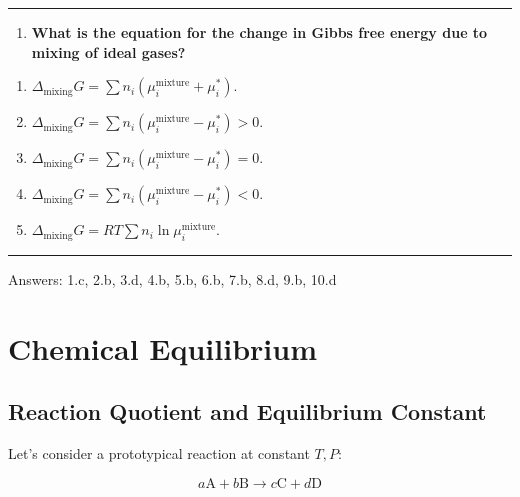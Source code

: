 \documentclass[
  9pt,
]{extbook}
\providecommand{\tightlist}{%
  \setlength{\itemsep}{0pt}\setlength{\parskip}{0pt}}
\theoremstyle{definition}
\theoremstyle{definition}
\theoremstyle{definition}
\theoremstyle{definition}
\theoremstyle{remark}
\begin{document}
\begin{center}\rule{0.5\linewidth}{0.5pt}\end{center}

\begin{enumerate}
\def\labelenumi{\arabic{enumi}.}
\setcounter{enumi}{9}
\tightlist
\item
  \textbf{What is the equation for the change in Gibbs free energy due to mixing of ideal gases?}
\end{enumerate}

\begin{enumerate}
\def\labelenumi{\alph{enumi}.}
\tightlist
\item
  \(\Delta_{\text{mixing}}G = \sum n_i(\mu_i^{\text{mixture}} + \mu_i^*)\).
\item
  \(\Delta_{\text{mixing}}G = \sum n_i(\mu_i^{\text{mixture}} - \mu_i^*) > 0\).
\item
  \(\Delta_{\text{mixing}}G = \sum n_i(\mu_i^{\text{mixture}} - \mu_i^*) = 0\).
\item
  \(\Delta_{\text{mixing}}G = \sum n_i(\mu_i^{\text{mixture}} - \mu_i^*) < 0\).
\item
  \(\Delta_{\text{mixing}}G = RT\sum n_i\ln\mu_i^{\text{mixture}}\).
\end{enumerate}

\begin{center}\rule{0.5\linewidth}{0.5pt}\end{center}

Answers: 1.c, 2.b, 3.d, 4.b, 5.b, 6.b, 7.b, 8.d, 9.b, 10.d

\renewcommand*{\standardstate}{{-\kern-6pt{\ominus}\kern-6pt-}}

\chapter{Chemical Equilibrium}\label{ChemicalEquilibrium}

\section{Reaction Quotient and Equilibrium Constant}\label{reaction-quotient-and-equilibrium-constant}

Let's consider a prototypical reaction at constant \(T,P\):

\begin{equation}
 a\mathrm{A} + b\mathrm{B} \rightarrow c\mathrm{C} + d\mathrm{D} 
\label{eq:reaction4}
\end{equation}
\end{document}
